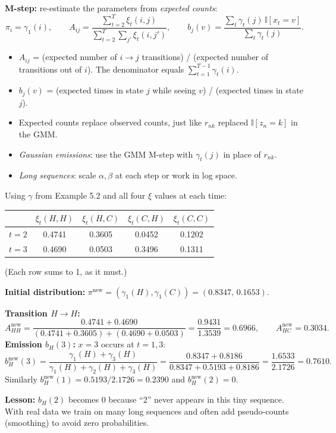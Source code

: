 \documentclass[11pt,a4paper]{article}
\newcommand{\Ind}{\mathbb{I}}
\begin{document}
\textbf{M-step:} re-estimate the parameters from \emph{expected counts}:
\[
\pi_i=\gamma_1(i),\qquad
A_{ij}=\frac{\sum_{t=2}^T\xi_t(i,j)}{\sum_{t=2}^T\sum_{j'}\xi_t(i,j')},\qquad
b_j(v)=\frac{\sum_t\gamma_t(j)\,\Ind[x_t=v]}{\sum_t\gamma_t(j)}.
\]
\begin{itemize}[nosep]
\item $A_{ij}$ = (expected number of $i\to j$ transitions) / (expected number of transitions out of $i$). The denominator equals $\sum_{t=1}^{T-1}\gamma_t(i)$.
\item $b_j(v)$ = (expected times in state $j$ while seeing $v$) / (expected times in state $j$).
\item Expected counts replace observed counts, just like $r_{nk}$ replaced $\Ind[z_n=k]$ in the GMM.
\item \emph{Gaussian emissions}: use the GMM M-step with $\gamma_t(j)$ in place of $r_{nk}$.
\item \emph{Long sequences}: scale $\alpha,\beta$ at each step or work in log space.
\end{itemize}

\begin{example}[Example 5.4: One Baum--Welch update from $X=(3,1,3)$]
Using $\gamma$ from Example 5.2 and all four $\xi$ values at each time:
\begin{center}
\begin{tabular}{@{}lcccc@{}}
\toprule
& $\xi_t(H,H)$ & $\xi_t(H,C)$ & $\xi_t(C,H)$ & $\xi_t(C,C)$\\
\midrule
$t=2$ & 0.4741 & 0.3605 & 0.0452 & 0.1202\\
$t=3$ & 0.4690 & 0.0503 & 0.3496 & 0.1311\\
\bottomrule
\end{tabular}
\end{center}
(Each row sums to 1, as it must.)

\textbf{Initial distribution:} $\pi^{\text{new}}=(\gamma_1(H),\gamma_1(C))=(0.8347,\,0.1653)$.

\textbf{Transition $H\to H$:}
\[
A_{HH}^{\text{new}}=\frac{0.4741+0.4690}{(0.4741+0.3605)+(0.4690+0.0503)}=\frac{0.9431}{1.3539}=0.6966,\qquad A_{HC}^{\text{new}}=0.3034.
\]
\textbf{Emission $b_H(3)$:} $x=3$ occurs at $t=1,3$:
\[
b_H^{\text{new}}(3)=\frac{\gamma_1(H)+\gamma_3(H)}{\gamma_1(H)+\gamma_2(H)+\gamma_3(H)}=\frac{0.8347+0.8186}{0.8347+0.5193+0.8186}=\frac{1.6533}{2.1726}=0.7610.
\]
Similarly $b_H^{\text{new}}(1)=0.5193/2.1726=0.2390$ and $b_H^{\text{new}}(2)=0$.

\textbf{Lesson:} $b_H(2)$ becomes $0$ because ``2'' never appears in this tiny sequence. With real data we train on many long sequences and often add pseudo-counts (smoothing) to avoid zero probabilities.
\end{example}
\end{document}
